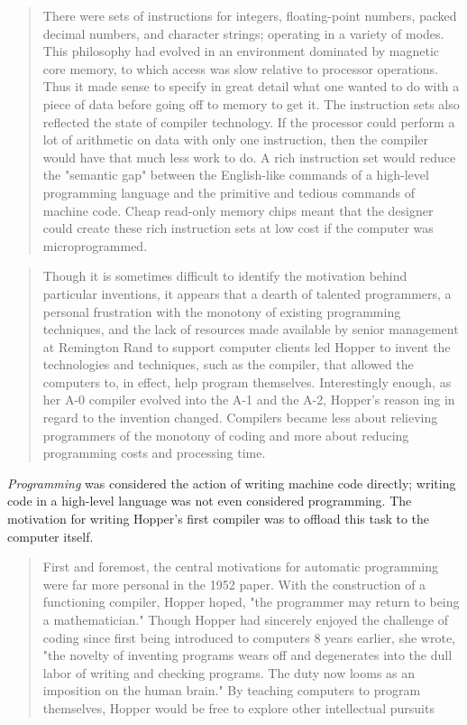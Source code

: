 \begin{quotation}
There were sets of instructions for integers, floating-point numbers, packed decimal numbers, and character
strings; operating in a variety of modes. This philosophy had evolved in an environment dominated by
magnetic core memory, to which access was slow relative to processor operations. Thus it made sense to
specify in great detail what one wanted to do with a piece of data before going off to memory to get it. The
instruction sets also reflected the state of compiler technology. If the processor could perform a lot of
arithmetic on data with only one instruction, then the compiler would have that much less work to do. A rich
instruction set would reduce the "semantic gap" between the English-like commands of a high-level
programming language and the primitive and tedious commands of machine code. Cheap read-only memory
chips meant that the designer could create these rich instruction sets at low cost if the computer was microprogrammed.
\end{quotation}



\begin{quotation}
Though it is sometimes difficult to identify the motivation behind particular 
inventions, it appears that a dearth of talented programmers, a personal 
frustration with the monotony of existing programming techniques, and the lack of resources 
made available by senior management at Remington Rand to support computer 
clients led Hopper to invent the technologies and techniques, such as the compiler, 
that allowed the computers to, in effect, help program themselves. 
Interestingly enough, as her A-0 compiler evolved into the A-1 and the A-2, Hopper's reason
ing in regard to the invention changed. Compilers became less about relieving 
programmers of the monotony of coding and more about reducing programming costs and processing time.
\end{quotation}

\textit{Programming} was considered the action of writing machine code directly;
writing code in a high-level language was not even considered programming.
The motivation for writing Hopper's first compiler was to offload this task
to the computer itself.

\begin{quotation}
First and
foremost, the central motivations for automatic programming
were far more personal in the 1952 paper. With the construction
of a functioning compiler, Hopper hoped, "the programmer
may return to being a mathematician." Though Hopper had
sincerely enjoyed the challenge of coding since first being introduced to computers 8 years earlier, she wrote, "the novelty of
inventing programs wears off and degenerates into the dull labor
of writing and checking programs. The duty now looms as an
imposition on the human brain." By teaching computers to
program themselves, Hopper would be free to explore other
intellectual pursuits 
\end{quotation}

